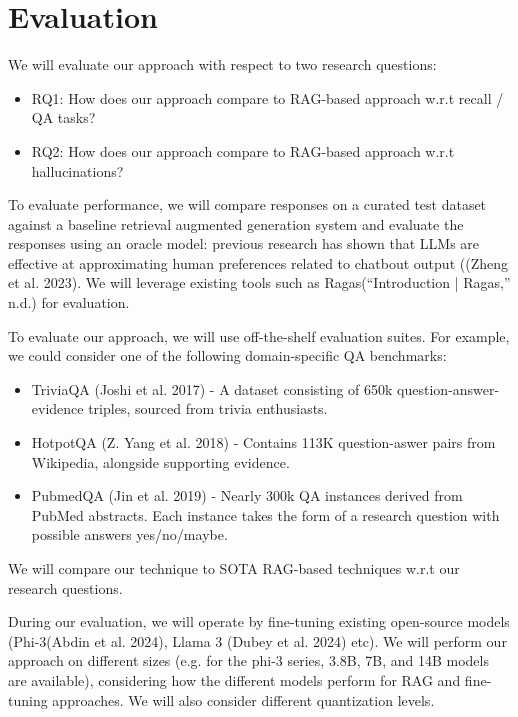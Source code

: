 \section{Evaluation}
We will evaluate our approach with respect to two research questions:

\begin{itemize}
\item RQ1: How does our approach compare to RAG-based approach w.r.t recall / QA tasks?
\item RQ2: How does our approach compare to RAG-based approach w.r.t hallucinations?
\end{itemize}

To evaluate performance, we will compare responses on a curated test dataset against a baseline retrieval augmented generation system and evaluate the responses using an oracle model: previous research has shown that LLMs are effective at approximating human preferences related to chatbout output ((Zheng et al. 2023). We will leverage existing tools such as Ragas(“Introduction | Ragas,” n.d.) for evaluation.

To evaluate our approach, we will use off-the-shelf evaluation suites. For example, we could consider one of the following domain-specific QA benchmarks:

\begin{itemize}
\item TriviaQA (Joshi et al. 2017) - A dataset consisting of 650k question-answer-evidence triples, sourced from trivia enthusiasts.
\item HotpotQA (Z. Yang et al. 2018) - Contains 113K question-aswer pairs from Wikipedia, alongside supporting evidence.
\item PubmedQA (Jin et al. 2019) - Nearly 300k QA instances derived from PubMed abstracts. Each instance takes the form of a research question with possible answers yes/no/maybe.
\end{itemize}

We will compare our technique to SOTA RAG-based techniques w.r.t our research questions.

During our evaluation, we will operate by fine-tuning existing open-source
models (Phi-3(Abdin et al. 2024), Llama 3 (Dubey et al. 2024) etc). We will
perform our approach on different sizes (e.g. for the phi-3 series, 3.8B, 7B,
and 14B models are available), considering how the different models perform for
RAG and fine-tuning approaches. We will also consider different quantization
levels.
